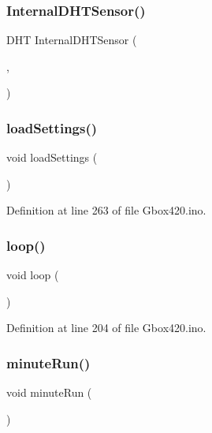 \subsubsection{\texorpdfstring{InternalDHTSensor()}{InternalDHTSensor()}}
{\footnotesize\ttfamily D\+HT Internal\+D\+H\+T\+Sensor (\begin{DoxyParamCaption}\item[{\mbox{\hyperlink{420_pins_8h_a1faa933a60b338f39c3f2069e0180c25}{Internal\+D\+H\+T\+Sensor\+In\+Pin}}}]{,  }\item[{\mbox{\hyperlink{_gbox420_8ino_adc7a68db9f5a31bc91546195883a2bbc}{D\+H\+T\+Type}}}]{ }\end{DoxyParamCaption})}

\mbox{\label{_gbox420_8ino_a1165e1d4439a045e94970c9fbc73bb3c}} 
\subsubsection{\texorpdfstring{loadSettings()}{loadSettings()}}
{\footnotesize\ttfamily void load\+Settings (\begin{DoxyParamCaption}{ }\end{DoxyParamCaption})}



Definition at line 263 of file Gbox420.\+ino.

\mbox{\label{_gbox420_8ino_afe461d27b9c48d5921c00d521181f12f}} 
\subsubsection{\texorpdfstring{loop()}{loop()}}
{\footnotesize\ttfamily void loop (\begin{DoxyParamCaption}{ }\end{DoxyParamCaption})}



Definition at line 204 of file Gbox420.\+ino.

\mbox{\label{_gbox420_8ino_ab368cbcf5cb1931e10a965b20c44feb1}} 
\subsubsection{\texorpdfstring{minuteRun()}{minuteRun()}}
{\footnotesize\ttfamily void minute\+Run (\begin{DoxyParamCaption}{ }\end{DoxyParamCaption})}



